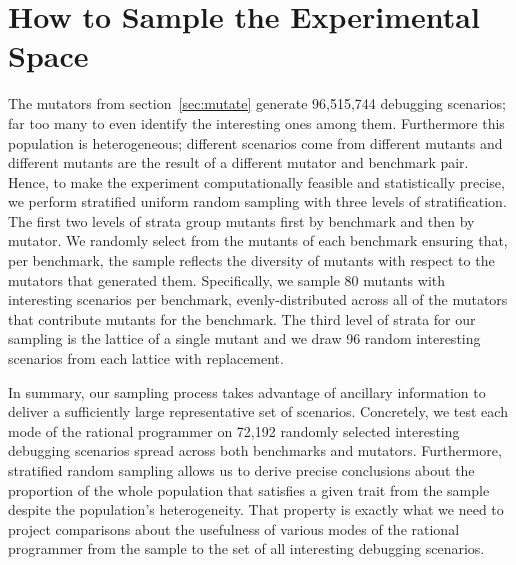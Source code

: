 \section{How to Sample the Experimental Space} 

The mutators from section~\ref{sec:mutate} generate 96,515,744 debugging
scenarios; far too many to even identify the interesting ones among them.
Furthermore this population is heterogeneous; different scenarios come
from different mutants and different mutants are the result of a
different mutator and benchmark pair. Hence, to make the experiment
computationally feasible and statistically precise, we perform stratified
uniform random sampling with three levels of stratification.  The first
two levels of strata group mutants first by benchmark and then by mutator. 
We randomly select from the mutants of
each benchmark ensuring that, per
benchmark, the sample reflects the diversity of mutants with respect to
the mutators that generated them.  Specifically,  we sample 80 mutants
with interesting scenarios per benchmark,  evenly-distributed across all
of the mutators that contribute mutants for the benchmark.  The third
level of strata for our sampling is the lattice of a single mutant and we draw 96 random
interesting scenarios from each lattice with replacement.

In summary, our sampling process takes advantage of ancillary information
to deliver a  sufficiently large representative set of scenarios.
Concretely, we test each
mode of the rational programmer on 72,192 randomly selected interesting
debugging scenarios spread across both benchmarks and mutators.
Furthermore, stratified random sampling allows us to derive precise conclusions
about the proportion of the whole population that satisfies a given trait 
from the sample despite the population's heterogeneity.
That property is exactly what we need to project comparisons about the
usefulness of various modes of the
rational programmer from the sample to the set of all interesting debugging
scenarios.  
 



